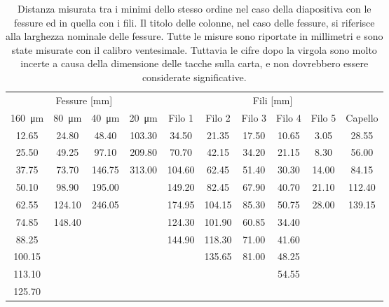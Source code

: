 \begin{table}[t!]
    \centering
    \footnotesize
    \begin{tabular}{c c c c | c c c c c c}
        \toprule
        \multicolumn{4}{c|}{Fessure [mm]} & \multicolumn{6}{c}{Fili [mm]}  \\
        \SI{160}{\micro\metre}& \SI{80}{\micro\metre}& \SI{40}{\micro\metre}& \SI{20}{\micro\metre}&
        Filo 1&  Filo 2&  Filo 3& Filo 4& Filo 5& Capello \\[1mm]
        \midrule
        12.65&     24.80&    48.40&   103.30& 34.50&    21.35&   17.50&  10.65&  3.05&   28.55  \\
        25.50&     49.25&    97.10&   209.80& 70.70&    42.15&   34.20&  21.15&  8.30&   56.00  \\
        37.75&     73.70&   146.75&   313.00& 104.60&   62.45&   51.40&  30.30&  14.00&  84.15  \\
        50.10&     98.90&   195.00&         & 149.20&   82.45&   67.90&  40.70&  21.10&  112.40 \\
        62.55&    124.10&   246.05&         & 174.95&   104.15&  85.30&  50.75&  28.00&  139.15 \\
        74.85&    148.40&&                  & 124.30&   101.90&  60.85&  34.40&       &         \\      
        88.25&&&                            & 144.90&   118.30&  71.00&  41.60&       &         \\
        100.15&&&                           &       &   135.65&  81.00&  48.25&       &         \\
        113.10&&&                           &       &        &       &   54.55&       &         \\
        125.70&&&                           &       &        &       &        &       &         \\
        \bottomrule
    \end{tabular}
    \caption{Distanza misurata tra i minimi dello stesso ordine nel caso della diapositiva con le fessure ed
        in quella con i fili. Il titolo delle colonne, nel caso delle fessure, si riferisce alla larghezza nominale delle fessure.
        Tutte le misure sono riportate in millimetri e sono state misurate con il calibro ventesimale. Tuttavia
        le cifre dopo la virgola sono molto incerte a causa della dimensione delle tacche sulla carta, e non dovrebbero
        essere considerate significative.}
    \label{tab:ff}
\end{table}

